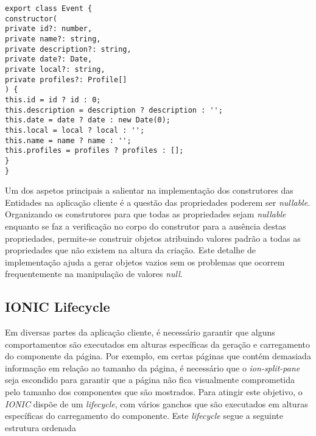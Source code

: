 \begin{lstlisting}
export class Event {
constructor(
private id?: number,
private name?: string,
private description?: string,
private date?: Date,
private local?: string,
private profiles?: Profile[]
) {
this.id = id ? id : 0;
this.description = description ? description : '';
this.date = date ? date : new Date(0);
this.local = local ? local : '';
this.name = name ? name : '';
this.profiles = profiles ? profiles : [];
}
}
\end{lstlisting}

Um dos aspetos principais a salientar na implementação dos construtores das Entidades na aplicação cliente é a questão das propriedades poderem ser \emph{nullable}. Organizando os construtores para que todas as propriedades sejam \emph{nullable} enquanto se faz a verificação no corpo do construtor para a ausência destas propriedades, permite-se construir objetos atribuindo valores padrão a todas as propriedades que não existem na altura da criação. Este detalhe de implementação ajuda a gerar objetos vazios sem os problemas que ocorrem frequentemente na manipulação de valores \emph{null}.


\subsection{IONIC Lifecycle}

Em diversas partes da aplicação cliente, é necessário garantir que alguns comportamentos são executados em alturas específicas da geração e carregamento do componente da página. Por exemplo, em certas páginas que contém demasiada informação em relação ao tamanho da página, é necessário que o \textit{ion-split-pane} seja escondido para garantir que a página não fica visualmente comprometida pelo tamanho dos componentes que são mostrados. Para atingir este objetivo, o \textit{IONIC} dispõe de um \textit{lifecycle}, com vários ganchos que são executados em alturas específicas do carregamento do componente. Este \textit{lifecycle} segue a seguinte estrutura ordenada

